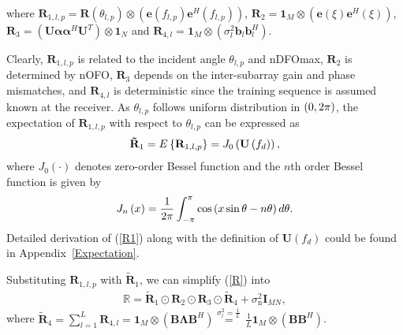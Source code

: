 \documentclass[12pt, draftclsnofoot, onecolumn]{IEEEtran}
\begin{document}
where ${{\mathbf{R}}_{1,l,p}}=\mathbf{R}\left( {{\theta }_{l,p}} \right)\otimes \left( \mathbf{e}\left( {{f}_{l,p}} \right){{\mathbf{e}}^{H}}\left( {{f}_{l,p}} \right) \right)$, ${{\mathbf{R}}_{2}}={{\mathbf{1}}_{M}}\otimes \left( \mathbf{e}\left( \xi  \right){{\mathbf{e}}^{H}}\left( \xi  \right) \right)$, ${{\mathbf{R}}_{3}}=\left( \mathbf{U}{\boldsymbol \alpha }{{\boldsymbol{\alpha }}^{H}}{{\mathbf{U}}^{T}} \right)\otimes {{\mathbf{1}}_{N}}$ and ${{\mathbf{R}}_{4,l}}={{\mathbf{1}}_{M}}\otimes \left( \sigma_{l}^{2} {{\mathbf{b}}_{l}}\mathbf{b}_{l}^{H} \right)$.

Clearly, ${{\mathbf{R}}_{1,l,p}}$ is related to the incident angle ${{\theta }_{l,p}}$ and nDFOmax, ${{\mathbf{R}}_{2}}$ is determined by nOFO, ${{\mathbf{R}}_{3}}$ depends on the inter-subarray gain and phase mismatches, and ${{\mathbf{R}}_{4,l}}$ is deterministic since the training sequence is assumed known at the receiver.
As ${{\theta }_{l,p}}$ follows uniform distribution in $(0, 2\rm{\pi})$, the expectation of ${{\mathbf{R}}_{1,l,p}}$ with respect to ${\theta }_{l,p}$ can be expressed as
\begin{align}{\label{R1}}
{{\mathbf{\tilde{R}}}_{1}}=E\left\{ {{\mathbf{R}}_{1,l,p}} \right\}={{J}_{0}}\left( \mathbf{U}\left( {{f}_{d}} \right) \right),
\end{align}
where ${{J}_{0}}\left(\cdot \right)$ denotes zero-order Bessel function and the $n$th order Bessel function is given by
\begin{align}
{{J}_{n}}\left( x \right)=\frac{1}{2{\rm\pi}}\int_{-{\rm\pi}}^{{\rm\pi}}{\cos \left( x\sin \theta -n\theta  \right)d\theta }.
\end{align}
Detailed derivation of (\ref{R1}) along with the definition of $\mathbf{U}\left( {{f}_{d}} \right)$ could be found in Appendix~\ref{Expectation}.

Substituting ${{\mathbf{R}}_{1,l,p}}$ with ${{\mathbf{\tilde{R}}}_{1}}$, we can simplify (\ref{R}) into
\begin{align}
 \mathbb{R} ={{{\mathbf{\tilde{R}}}}_{1}}\odot {{\mathbf{R}}_{2}}\odot {{\mathbf{R}}_{3}}\odot {{{\mathbf{\tilde{R}}}}_{4}}+{{\sigma }_{\mathrm{n}}^{2}} {{\mathbf{I}}_{MN}},
\end{align}
where ${{\mathbf{\tilde{R}}}_{4}} = \sum\limits_{l=1}^{L}{{{\mathbf{R}}_{4,l}}} ={{\mathbf{1}}_{M}}\otimes \left( \mathbf{B}\mathbf{\Lambda}{{\mathbf{B}}^{H}} \right) \overset{\sigma_{l}^{2} = \frac{1}{L}}{\mathop{=}}\, \frac{1}{L}{{\mathbf{1}}_{M}}\otimes \left( \mathbf{B}{{\mathbf{B}}^{H}} \right)$.
\end{document}
